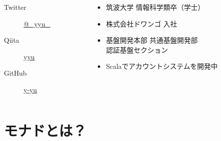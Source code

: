 \begin{frame}
\begin{columns}
\begin{column}{0.3\textwidth}
      \begin{description}
        \item[Twitter] \href{https://twitter.com/\_yyu\_}{@\_yyu\_}
        \item[Qiita] \href{http://qiita.com/yyu}{yyu}
        \item[GitHub] \href{https://github.com/y-yu}{y-yu}
      \end{description}
    \end{column}
    \begin{column}{0.7\textwidth}
      \begin{itemize}
        \item<2-> 筑波大学 情報科学類卒（学士）
        \item<3-> 株式会社ドワンゴ 入社
        \item<4-> 基盤開発本部 共通基盤開発部 \\
        認証基盤セクション
        \item<5-> Scalaでアカウントシステムを開発中
      \end{itemize}
    \end{column}
  \end{columns}
\end{frame}

\section{モナドとは？}

\newcommand{\Point}[1]{\mathtt{point}\left(#1\right)}
\newcommand{\FlatMap}[2]{\mathtt{flatMap}\left(#1\right)\left(#2\right)}

